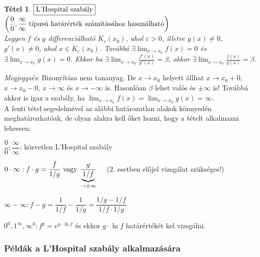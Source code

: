 \documentclass[a4paper,12pt,twoside]{book}
\newtheorem{tetel}{Tétel}[chapter]
\theoremstyle{break}
\theoremstyle{plain}
\begin{document}
\begin{tetel}$\boxed{$L'Hospital szabály$}$ $\qquad$ $\left(\dfrac{0}{0}, \dfrac{\infty}{\infty} \hbox{ típusú határérték számításához használható} \right)$\\
Legyen $f$ és $g$ differenciálható $\dot{K}_\varepsilon(x_0)$, ahol $\varepsilon>0$, illetve $g(x)\neq 0$, $g'(x)\neq 0$, ahol $x\in\dot{K}_\varepsilon(x_0)$. Továbbá $\displaystyle \exists\lim_{x\to x_0} f(x)=0$ és $\displaystyle \exists\lim_{x\to x_0} g(x)=0$. Ekkor ha $\displaystyle \exists\lim_{x\to x_0} \frac{f'(x)}{g'(x)}=\beta$, akkor $\displaystyle \exists\lim_{x\to x_0} \frac{f(x)}{g(x)}=\beta$.
\end{tetel}
\addtocounter{biz}{1}
\emph{Megjegyzés}: Bizonyítása nem tananyag. De $x\to x_0$ helyett állhat $x\to x_0+0$, $x\to x_0-0$, $x\to \infty$ és $x\to -\infty$ is. Hasonlóan $\beta$ lehet valós és $\pm\infty$ is! Továbbá akkor is igaz a szabály, ha $\displaystyle \lim_{x\to x_0} f(x) = \lim_{x\to x_0} g(x) = \infty$.\\

A fenti tétel segedelmével az alábbi határozatlan alakok könnyedén meghatározhatóak, de olyan alakra kell őket hozni, hogy a tételt alkalmazni lehessen:
\begin{itemize*}
 \item $\dfrac{0}{0}; \dfrac{\infty}{\infty}$: közvetlen L'Hospital szabály
 \item $0\cdot \infty: f\cdot g = \dfrac{f}{1/g} \hbox{ vagy } \dfrac{g}{\underbrace{1/f}_{\to \pm\infty}} \quad$ (2. esetben előjel vizsgálat szükséges!)
 \item $\infty - \infty: f - g = \dfrac{1}{1/f}-\dfrac{1}{1/g} = \dfrac{1/g-1/f}{1/f\cdot 1/g}$
 \item $0^0, 1^\infty, \infty^0: f^g = e^{g\cdot\ln f}$ és ekkor $g\cdot\ln f$ határértékét kel vizsgálni.
\end{itemize*}

\subsubsection{Példák a L'Hospital szabály alkalmazására}
\end{document}
